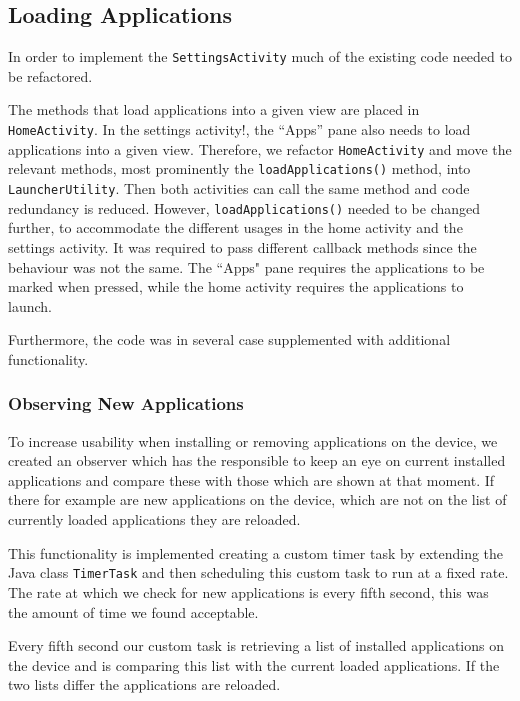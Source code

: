\subsection{Loading Applications}\label{sect:sprint3:refactoring}
In order to implement the \lstinline!SettingsActivity! much of the existing code needed to be refactored.

The methods that load applications into a given view are placed in \lstinline!HomeActivity!.
In the settings activity!, the ``Apps'' pane also needs to load applications into a given view.
Therefore, we refactor \lstinline!HomeActivity! and move the relevant methods, most prominently the \lstinline|loadApplications()| method, into \lstinline!LauncherUtility!.
Then both activities can call the same method and code redundancy is reduced. 
However, \lstinline|loadApplications()| needed to be changed further, to accommodate the different usages in the home activity and the settings activity. It was required to pass different callback methods since the behaviour was not the same. The ``Apps" pane requires the applications to be marked when pressed, while the home activity requires the applications to launch.

Furthermore, the code was in several case supplemented with additional functionality.

\subsubsection{Observing New Applications}\label{sec:sprint3:observing}
To increase usability when installing or removing applications on the device, we created an observer which has the responsible to keep an eye on current installed applications and compare these with those which are shown at that moment. If there for example are new applications on the device, which are not on the list of currently loaded applications they are reloaded.

This functionality is implemented creating a custom timer task by extending the Java class \lstinline!TimerTask! and then scheduling this custom task to run at a fixed rate. The rate at which we check for new applications is every fifth second, this was the amount of time we found acceptable.

Every fifth second our custom task is retrieving a list of installed applications on the device and is comparing this list with the current loaded applications. If the two lists differ the applications are reloaded.